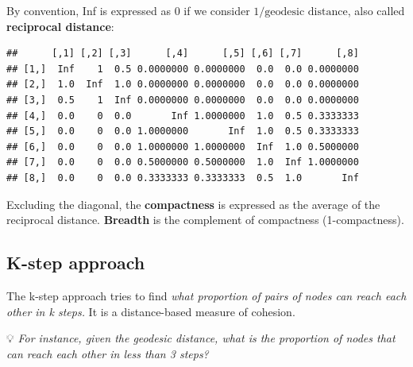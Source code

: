 \documentclass[
  notitlepage,
  onecolumn,
  openany]{book}
\newenvironment{Shaded}{\begin{snugshade}}{\end{snugshade}}
\newcommand{\CommentTok}[1]{\textcolor[rgb]{0.56,0.35,0.01}{\textit{#1}}}
\newcommand{\DecValTok}[1]{\textcolor[rgb]{0.00,0.00,0.81}{#1}}
\newcommand{\FunctionTok}[1]{\textcolor[rgb]{0.00,0.00,0.00}{#1}}
\newcommand{\NormalTok}[1]{#1}
\newcommand{\OtherTok}[1]{\textcolor[rgb]{0.56,0.35,0.01}{#1}}
\newcommand{\SpecialCharTok}[1]{\textcolor[rgb]{0.00,0.00,0.00}{#1}}
\begin{document}
By convention, Inf is expressed as 0 if we consider \(1/\text{geodesic distance}\), also called \textbf{reciprocal distance}:

\begin{Shaded}
\end{Shaded}

\begin{verbatim}
##      [,1] [,2] [,3]      [,4]      [,5] [,6] [,7]      [,8]
## [1,]  Inf    1  0.5 0.0000000 0.0000000  0.0  0.0 0.0000000
## [2,]  1.0  Inf  1.0 0.0000000 0.0000000  0.0  0.0 0.0000000
## [3,]  0.5    1  Inf 0.0000000 0.0000000  0.0  0.0 0.0000000
## [4,]  0.0    0  0.0       Inf 1.0000000  1.0  0.5 0.3333333
## [5,]  0.0    0  0.0 1.0000000       Inf  1.0  0.5 0.3333333
## [6,]  0.0    0  0.0 1.0000000 1.0000000  Inf  1.0 0.5000000
## [7,]  0.0    0  0.0 0.5000000 0.5000000  1.0  Inf 1.0000000
## [8,]  0.0    0  0.0 0.3333333 0.3333333  0.5  1.0       Inf
\end{verbatim}

Excluding the diagonal, the \textbf{compactness} is expressed as the average of the reciprocal distance. \textbf{Breadth} is the complement of compactness (1-compactness).

\hypertarget{k-step-approach}{%
\subsection{K-step approach}\label{k-step-approach}}

The k-step approach tries to find \emph{what proportion of pairs of nodes can reach each other in k steps.} It is a distance-based measure of cohesion.

💡 \emph{For instance, given the geodesic distance, what is the proportion of nodes that can reach each other in less than 3 steps?}

\begin{Shaded}
\end{Shaded}
\end{document}
